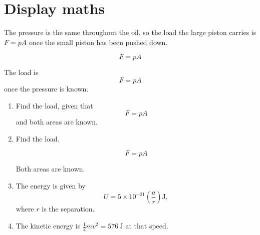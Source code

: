 \section{Display maths}

The pressure is the same throughout the oil, so the load the large piston carries is $F = p A$ once the small piston has been pushed down.

\[
F = p A
\]

The load is \[ F = p A \] once the pressure is known.

\begin{enumerate}
  \item Find the load, given that \[ F = p A \] and both areas are known.

  \item Find the load.

  \[
  F = p A
  \]

  Both areas are known.

  \item The energy is given by \[U = 5 \times 10^{-21} \left( \frac{a}{r} \right)
    \text{J},\] where $r$ is the separation.

  \item The kinetic energy is $\frac{1}{2} m v^2 = 576\,
  \text{J}$ at that speed.
\end{enumerate}
